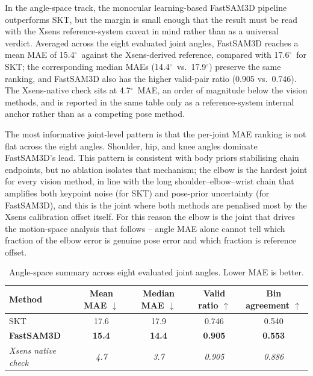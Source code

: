 \documentclass[12pt,a4paper]{article}
\newcommand{\good}[1]{\textcolor{goodcolor}{\textbf{#1}}}
\newcommand{\degr}{\ensuremath{^\circ}}
\begin{document}
In the angle-space track, the monocular learning-based FastSAM3D pipeline
outperforms SKT, but the margin is small enough that the result must be
read with the Xsens reference-system caveat in mind rather than as a
universal verdict.
Averaged across the eight evaluated joint angles, FastSAM3D reaches a mean
MAE of 15.4\degr\ against the Xsens-derived reference, compared with
17.6\degr\ for SKT; the corresponding median MAEs (14.4\degr\ vs.\
17.9\degr) preserve the same ranking, and FastSAM3D also has the higher
valid-pair ratio (0.905 vs.\ 0.746).
The Xsens-native check sits at 4.7\degr\ MAE, an order of magnitude below
the vision methods, and is reported in the same table only as a
reference-system internal anchor rather than as a competing pose method.

The most informative joint-level pattern is that the per-joint MAE
ranking is not flat across the eight angles.
Shoulder, hip, and knee angles dominate FastSAM3D's lead.  This pattern is
consistent with body priors stabilising chain endpoints, but no ablation
isolates that mechanism; the elbow is the
hardest joint for every vision method, in line with the long
shoulder--elbow--wrist chain that amplifies both keypoint noise (for SKT)
and pose-prior uncertainty (for FastSAM3D), and this is the joint where
both methods are penalised most by the Xsens calibration offset
itself.
For this reason the elbow is the joint that drives the motion-space
analysis that follows -- angle MAE alone cannot tell which fraction of
the elbow error is genuine pose error and which fraction is reference
offset.

\begin{table}[!htbp]
  \centering
  \caption{Angle-space summary across eight evaluated joint angles. Lower MAE is better.}
  \label{tab:angle_summary}
  \small
  \begin{tabular}{lcccc}
    \toprule
    Method & Mean MAE $\downarrow$ & Median MAE $\downarrow$ &
    Valid ratio $\uparrow$ & Bin agreement $\uparrow$ \\
    \midrule
    SKT & 17.6 & 17.9 & 0.746 & 0.540 \\
    \good{FastSAM3D} & \good{15.4} & \good{14.4} & \good{0.905} & \good{0.553} \\
    \textit{Xsens native check} & \textit{4.7} & \textit{3.7} & \textit{0.905} & \textit{0.886} \\
    \bottomrule
  \end{tabular}
\end{table}
\end{document}
